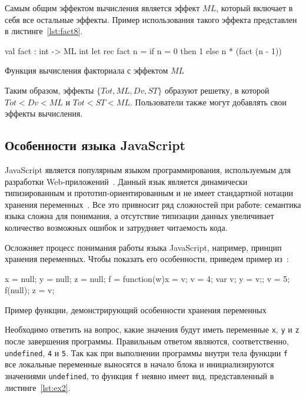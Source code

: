Самым общим эффектом вычисления является эффект $ML$, который включает в себя все остальные эффекты. Пример использования такого эффекта представлен в листинге~\ref{lst:fact8}.

\begin{listing}[H]
\begin{pyglist}[language=ocaml,numbers=none,numbersep=5pt, fontsize=\small]
val fact : int -> ML int 
let rec fact n =
    if n = 0 then 1 else n * (fact (n - 1)) 
\end{pyglist}
\caption{Функция вычисления факториала с эффектом $ML$}
\label{lst:fact8} 
\end{listing}

Таким образом, эффекты $\{Tot, ML, Dv, ST\}$ образуют решетку, в которой $Tot < Dv < ML$ и  $Tot < ST < ML$. Пользователи также могут добавлять свои эффекты вычисления. 

\subsection{Особенности языка JavaScript}

JavaScript является популярным языком программирования, используемым для разработки Web-приложений~\cite{top10}. Данный язык является динамически типизированным и прототип-ориентированным и не имеет стандартной нотации хранения переменных~\cite{js_semantics}. Все это привносит ряд сложностей при работе: семантика языка сложна для понимания, а отсутствие типизации данных увеличивает количество возможных ошибок и затрудняет читаемость кода.

Осложняет процесс понимания работы языка JavaScript, например, принцип хранения переменных. Чтобы показать его особенности, приведем пример из~\cite{js_semantics}: 

\begin{listing}
\begin{pyglist}[language=javascript,numbers=none,numbersep=5pt, fontsize=\small]
    x = null; y = null; z = null;
    f = function(w){x = v; v = 4; var v; y = v;};
    v = 5; f(null); z = v;
\end{pyglist}
\caption{Пример функции, демонстрирующий особенности хранения переменных}
\label{lst:ex1} 
\end{listing}

Необходимо ответить на вопрос, какие значения будут иметь переменные \verb|x|, \verb|y| и \verb|z| после завершения программы. Правильным ответом являются, соответственно, \verb|undefined|, \verb|4| и \verb|5|. Так как при выполнении программы внутри тела функции \verb|f| все локальные переменные выносятся в начало блока и инициализируются значениями \verb|undefined|, то функция \verb|f| неявно имеет вид, представленный в листинге~\ref{lst:ex2}.

